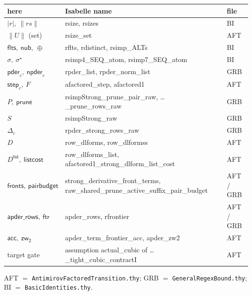 \documentclass[11pt]{article}
\theoremstyle{remark}
\newcommand{\rs}[1]{\lvert #1\rvert}                 %
\newcommand{\rss}[1]{\lVert #1\rVert}                %
\newcommand{\nub}{\mathsf{nub}}
\newcommand{\flts}{\mathsf{flts}}
\newcommand{\altsmart}{\oplus}
\newcommand{\seqnorm}{\sigma}
\newcommand{\seqstar}{\sigma^{\star}}
\newcommand{\pder}{\mathsf{pder}}
\newcommand{\npder}{\mathsf{npder}}
\newcommand{\Fact}{F}
\newcommand{\Sstrong}{S}
\newcommand{\Dstep}{\Delta}
\newcommand{\open}{D}
\newcommand{\Dlist}{D^{\mathsf{list}}}
\newcommand{\listcost}{\mathsf{listcost}}
\newcommand{\fronts}{\mathsf{fronts}}
\newcommand{\pb}{\mathsf{pairbudget}}
\newcommand{\thy}[1]{\textsf{\small #1}}
\begin{document}
\begin{center}
\scriptsize
\begin{tabular}{@{}l>{\raggedright\arraybackslash}p{7.4cm}l@{}}
\toprule
here & Isabelle name & file \\
\midrule
$\rs{r},\ \rss{rs}$ & \thy{rsize}, \thy{rsizes} & BI \\
$\rss{U}$ (set) & \thy{rsize\_set} & AFT \\
$\flts,\ \nub,\ \altsmart$ & \thy{rflts}, \thy{rdistinct}, \thy{rsimp\_ALTs} & BI \\
$\seqnorm,\ \seqstar$ & \thy{rsimp4\_SEQ\_atom}, \thy{rsimp7\_SEQ\_atom} & BI \\
$\pder_c,\ \npder_c$ & \thy{rpder\_list}, \thy{rpder\_norm\_list} & GRB \\
$\mathsf{step}_c,\ \Fact$ & \thy{afactored\_step}, \thy{afactored1} & AFT \\
$P,\ \mathsf{prune}$ & \thy{rsimpStrong\_prune\_pair\_raw}, \thy{\dots\_prune\_rows\_raw} & GRB \\
$\Sstrong$ & \thy{rsimpStrong\_raw} & GRB \\
$\Dstep_c$ & \thy{rpder\_strong\_rows\_raw} & GRB \\
$\open$ & \thy{row\_dlforms}, \thy{row\_dlformss} & AFT \\
$\Dlist,\ \listcost$ & \thy{row\_dlforms\_list}, \thy{afactored1\_strong\_dlform\_list\_cost} & AFT \\
$\fronts,\ \pb$ & \thy{strong\_derivative\_front\_terms}, \thy{raw\_shared\_prune\_active\_suffix\_pair\_budget} & AFT / GRB \\
$\mathsf{apder\_rows},\ \mathsf{ftr}$ & \thy{apder\_rows}, \thy{rfrontier} & AFT / GRB \\
$\mathsf{acc},\ \mathsf{zw_2}$ & \thy{apder\_term\_frontier\_acc}, \thy{apder\_zw2} & AFT \\
target gate & assumption \thy{actual\_cubic} of \thy{\dots\_tight\_cubic\_contractI} & AFT \\
\bottomrule
\end{tabular}

\smallskip
AFT $=$ \texttt{AntimirovFactoredTransition.thy};\;
GRB $=$ \texttt{GeneralRegexBound.thy};\;
BI $=$ \texttt{BasicIdentities.thy}.
\end{center}
\end{document}
